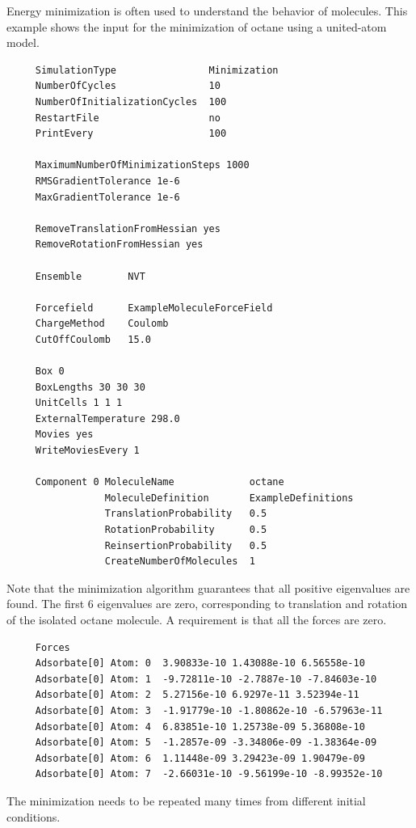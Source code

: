 Energy minimization is often used to understand the behavior of molecules.
This example shows the input for the minimization of octane using a united-atom model\cite{Dubbeldam2004}.
\begin{tiny}
\begin{verbatim}
     SimulationType                Minimization
     NumberOfCycles                10
     NumberOfInitializationCycles  100
     RestartFile                   no
     PrintEvery                    100
     
     MaximumNumberOfMinimizationSteps 1000
     RMSGradientTolerance 1e-6
     MaxGradientTolerance 1e-6
     
     RemoveTranslationFromHessian yes
     RemoveRotationFromHessian yes
     
     Ensemble        NVT
     
     Forcefield      ExampleMoleculeForceField
     ChargeMethod    Coulomb
     CutOffCoulomb   15.0
     
     Box 0
     BoxLengths 30 30 30
     UnitCells 1 1 1
     ExternalTemperature 298.0
     Movies yes
     WriteMoviesEvery 1
     
     Component 0 MoleculeName             octane
                 MoleculeDefinition       ExampleDefinitions
                 TranslationProbability   0.5
                 RotationProbability      0.5
                 ReinsertionProbability   0.5
                 CreateNumberOfMolecules  1
\end{verbatim}
\end{tiny}
Note that the minimization algorithm guarantees that all positive eigenvalues are found.
The first 6 eigenvalues are zero, corresponding to translation and rotation of the isolated octane molecule.
A requirement is that all the forces are zero.
\begin{tiny}
\begin{verbatim}
     Forces
     Adsorbate[0] Atom: 0  3.90833e-10 1.43088e-10 6.56558e-10
     Adsorbate[0] Atom: 1  -9.72811e-10 -2.7887e-10 -7.84603e-10
     Adsorbate[0] Atom: 2  5.27156e-10 6.9297e-11 3.52394e-11
     Adsorbate[0] Atom: 3  -1.91779e-10 -1.80862e-10 -6.57963e-11
     Adsorbate[0] Atom: 4  6.83851e-10 1.25738e-09 5.36808e-10
     Adsorbate[0] Atom: 5  -1.2857e-09 -3.34806e-09 -1.38364e-09
     Adsorbate[0] Atom: 6  1.11448e-09 3.29423e-09 1.90479e-09
     Adsorbate[0] Atom: 7  -2.66031e-10 -9.56199e-10 -8.99352e-10
\end{verbatim}
\end{tiny}
The minimization needs to be repeated many times from different initial conditions.
